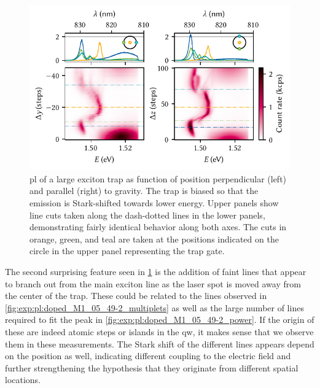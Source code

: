 \begin{figure}
    \centering
    \includegraphics{img/pdf/experiment/doped_M1_05_49-2_positioning}
    \caption[
        $V_{y}=V_{z}=\qty{30}{\volt}$.
        \protect\newline
    ]{
        \Gls{pl} of a large exciton trap as function of position perpendicular (left) and parallel (right) to gravity.
        The trap is biased so that the emission is Stark-shifted towards lower energy.
        Upper panels show line cuts taken along the dash-dotted lines in the lower panels, demonstrating fairly identical behavior along both axes.
        The cuts in orange, green, and teal are taken at the positions indicated on the circle in the upper panel representing the trap gate.
    }
    \label{fig:exp:pl:doped_M1_05_49-2_positioning}
\end{figure}

The second surprising feature seen in \cref{fig:exp:pl:doped_M1_05_49-2_positioning} is the addition of faint lines that appear to branch out from the main exciton line as the laser spot is moved away from the center of the trap.
These could be related to the lines observed in \cref{fig:exp:pl:doped_M1_05_49-2_multiplets} as well as the large number of lines required to fit the peak in \cref{fig:exp:pl:doped_M1_05_49-2_power}.
If the origin of these are indeed atomic steps or islands in the \gls{qw}, it makes sense that we observe them in these measurements.
The Stark shift of the different lines appears depend on the position as well, indicating different coupling to the electric field and further strengthening the hypothesis that they originate from different spatial locations.

